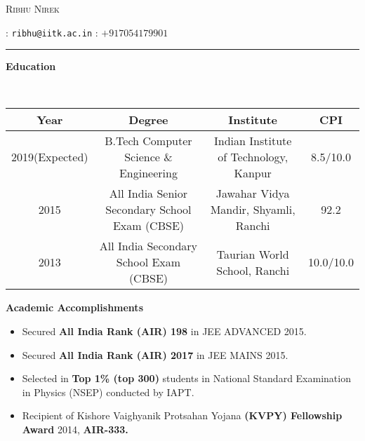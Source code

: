 \documentclass[12pt]{article}
\begin{document}

\begin{adjustwidth}{-3.4cm}{-0.5cm}

\begin{LARGE}
\textsc{Ribhu Nirek}
\end{LARGE}
\hspace{2.5cm}\Email : \texttt{ribhu@iitk.ac.in}
\hspace{3.5cm}\Mobilefone : $+91 7054179901$ 
\rule{19.2cm}{0.4pt} 

\begin{flushleft}

\begin{large}
\textbf{Education}
\end{large} \\ 

\end{flushleft}

\begin{center}

\begin{footnotesize}
\begin{tabular}{|c|c|c|c|}

\hline
Year &Degree &Institute &CPI \\ \hline
2019(Expected) &B.Tech Computer Science \& Engineering &Indian Institute of Technology, Kanpur &8.5/10.0\\ \hline
2015 &All India Senior Secondary School Exam (CBSE) &Jawahar Vidya Mandir, Shyamli, Ranchi &92.2\\ \hline 
2013 &All India Secondary School Exam (CBSE)&Taurian World School, Ranchi&10.0/10.0\\ \hline

\end{tabular}
\end{footnotesize}
\end{center}

\begin{flushleft}
\vline 

\begin{large}
 \textbf{Academic Accomplishments} \\
 \end{large} 

\begin{itemize}
\item Secured \textbf{All India Rank (AIR) 198} in JEE ADVANCED 2015.
\item Secured \textbf{All India Rank (AIR) 2017} in JEE MAINS 2015.
\item Selected in \textbf{Top 1\% (top 300)} students in National Standard Examination in Physics (NSEP) conducted by IAPT.
\item Recipient of Kishore Vaighyanik Protsahan Yojana \textbf{(KVPY) Fellowship Award} 2014, \textbf{AIR-333.}
\end{itemize}


\end{flushleft}
\end{adjustwidth}
\end{document}
